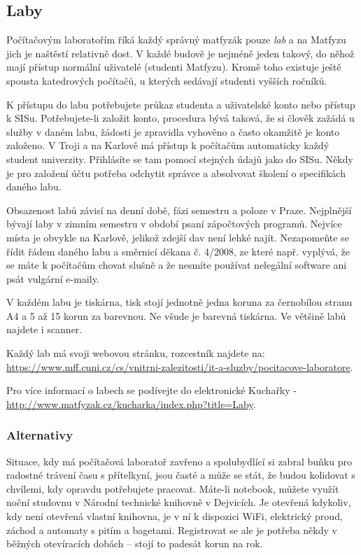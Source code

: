 \subsection{Laby}
Počítačovým laboratořím říká každý správný matfyzák pouze \textit{lab} a na
Matfyzu jich je naštěstí relativně dost. V každé budově je nejméně jeden takový,
do něhož mají přístup normální uživatelé (studenti Matfyzu).
Kromě toho existuje ještě spousta katedrových počítačů, u kterých sedávají
studenti vyšších ročníků.

K přístupu do labu potřebujete průkaz studenta a uživatelské konto nebo přístup k SISu.
Potřebujete-li založit konto, procedura bývá taková, že si člověk zažádá u
služby v daném labu, žádosti je zpravidla vyhověno a často okamžitě je konto
založeno. V Troji a na Karlově má přístup k počítačům automaticky každý student
univerzity. Přihlásíte se tam pomocí stejných údajů jako do SISu. Někdy je pro
založení účtu potřeba odchytit správce a absolvovat školení o specifikách daného
labu.

Obsazenost labů závisí na denní době, fázi semestru a poloze v Praze. Nejplnější
bývají laby v zimním semestru v období psaní zápočtových programů. Nejvíce místa
je obvykle na Karlově, jelikož zdejší dav není lehké najít. Nezapomeňte se řídit řádem daného labu a
směrnicí děkana č. 4/2008, ze které např. vyplývá, že se máte k počítačům chovat
slušně a že nesmíte používat nelegální software ani psát vulgární e-maily.

V každém labu je tiskárna, tisk stojí jednotně jedna koruna za černobílou stranu
A4 a 5 až 15 korun za barevnou. Ne všude je barevná tiskárna. Ve většině labů
najdete i scanner.

Každý lab má svoji webovou stránku, rozcestník najdete na: \url{https://www.mff.cuni.cz/cs/vnitrni-zalezitosti/it-a-sluzby/pocitacove-laboratore}.

Pro více informací o labech se podívejte do elektronické Kuchařky - \url{http://www.matfyzak.cz/kucharka/index.php?title=Laby}.



\subsubsection{Alternativy}
Situace, kdy má počítačová laboratoř zavřeno a spolubydlící si zabral buňku pro
radostné trávení času s přítelkyní, jsou časté a může se stát, že budou
kolidovat s chvílemi, kdy opravdu potřebujete pracovat. Máte-li notebook, můžete
využít noční studovnu v Národní technické knihovně v Dejvicích. Je otevřená
kdykoliv, kdy není otevřená vlastní knihovna, je v ní k dispozici WiFi,
elektrický proud, záchod a automaty s pitím a bagetami. Registrovat se ale je
potřeba někdy v běžných otevíracích dobách – stojí to padesát korun na rok.